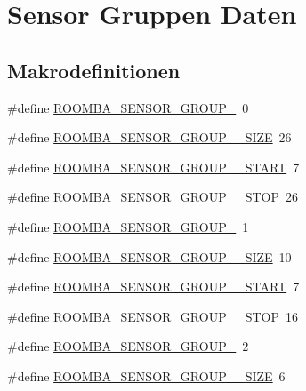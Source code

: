 \hypertarget{group__roomba__sensor__group}{\section{Sensor Gruppen Daten}
\label{group__roomba__sensor__group}
}
\subsection*{Makrodefinitionen}
\begin{DoxyCompactItemize}
\item 
\#define \hyperlink{group__roomba__sensor__group_ga77d5511be2897e760d980fdb72840e65}{R\-O\-O\-M\-B\-A\-\_\-\-S\-E\-N\-S\-O\-R\-\_\-\-G\-R\-O\-U\-P\-\_}~0
\item 
\#define \hyperlink{group__roomba__sensor__group_ga38f6f829286f9fbce79fbfa0f47e7ce4}{R\-O\-O\-M\-B\-A\-\_\-\-S\-E\-N\-S\-O\-R\-\_\-\-G\-R\-O\-U\-P\-\_\-\_\-\-S\-I\-Z\-E}~26
\item 
\#define \hyperlink{group__roomba__sensor__group_gac775409360135a757f9932b7bb65896a}{R\-O\-O\-M\-B\-A\-\_\-\-S\-E\-N\-S\-O\-R\-\_\-\-G\-R\-O\-U\-P\-\_\-\_\-\-S\-T\-A\-R\-T}~7
\item 
\#define \hyperlink{group__roomba__sensor__group_gaf797d39d4530ad605020d16be9f82350}{R\-O\-O\-M\-B\-A\-\_\-\-S\-E\-N\-S\-O\-R\-\_\-\-G\-R\-O\-U\-P\-\_\-\_\-\-S\-T\-O\-P}~26
\item 
\#define \hyperlink{group__roomba__sensor__group_ga40a35c78fe86679d04381b8c69488766}{R\-O\-O\-M\-B\-A\-\_\-\-S\-E\-N\-S\-O\-R\-\_\-\-G\-R\-O\-U\-P\-\_}~1
\item 
\#define \hyperlink{group__roomba__sensor__group_ga45360e7f26b3583cc2fa6fb81ca8ec88}{R\-O\-O\-M\-B\-A\-\_\-\-S\-E\-N\-S\-O\-R\-\_\-\-G\-R\-O\-U\-P\-\_\-\_\-\-S\-I\-Z\-E}~10
\item 
\#define \hyperlink{group__roomba__sensor__group_gac513223be40b9c57825220a3eff40ce6}{R\-O\-O\-M\-B\-A\-\_\-\-S\-E\-N\-S\-O\-R\-\_\-\-G\-R\-O\-U\-P\-\_\-\_\-\-S\-T\-A\-R\-T}~7
\item 
\#define \hyperlink{group__roomba__sensor__group_gac153692abb4392b8bbf4bec1247c1d36}{R\-O\-O\-M\-B\-A\-\_\-\-S\-E\-N\-S\-O\-R\-\_\-\-G\-R\-O\-U\-P\-\_\-\_\-\-S\-T\-O\-P}~16
\item 
\#define \hyperlink{group__roomba__sensor__group_gae33ca23697871d5efba5ad6c3ed313b6}{R\-O\-O\-M\-B\-A\-\_\-\-S\-E\-N\-S\-O\-R\-\_\-\-G\-R\-O\-U\-P\-\_}~2
\item 
\#define \hyperlink{group__roomba__sensor__group_gaff12a3021e710d16a58d6ad04ae4382d}{R\-O\-O\-M\-B\-A\-\_\-\-S\-E\-N\-S\-O\-R\-\_\-\-G\-R\-O\-U\-P\-\_\-\_\-\-S\-I\-Z\-E}~6

\end{DoxyCompactItemize}
